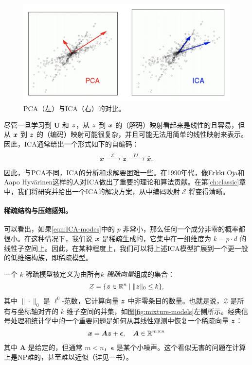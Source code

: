 \documentclass[../../book-main.tex]{subfiles}
\begin{document}
\begin{figure}
    \centering
    \includegraphics[width=0.7\linewidth]{figures/PCA_ICA.png}
    \caption{PCA（左）与ICA（右）的对比。}
    \label{fig:ICA-PCA}
\end{figure}

尽管一旦学习到 $\boldsymbol{U}$ 和 $\bm{z}$，从 $\bm{z}$ 到 $\bm{x}$ 的（解码）映射看起来是线性的且容易，但从 $\bm{x}$ 到 $\bm{z}$ 的（编码）映射可能很复杂，并且可能无法用简单的线性映射来表示。因此，ICA通常给出一个形式如下的自编码：
\begin{equation}
    \bm{x}   \xrightarrow{\hspace{2mm} \mathcal{E}\hspace{2mm}} \bm{z}  \xrightarrow{\hspace{2mm} \boldsymbol{U} \hspace{2mm}} \hat {\bm{x}}.
       \label{eqn:auto-encoding-ICA}
\end{equation}
因此，与PCA不同，ICA的分析和求解要困难一些。在1990年代，像Erkki Oja和Aapo Hyv\"{a}rinen\cite{hyvarinen-1997,Hyvrinen-2000}这样的人对ICA做出了重要的理论和算法贡献。在第\ref{ch:classic}章中，我们将研究并给出一个ICA的解决方案，从中编码映射 $\mathcal{E}$ 将变得清晰。



\paragraph{稀疏结构与压缩感知。}
可以看出，如果\eqref{eqn:ICA-modes}中的 $p$ 非常小，那么任何一个成分非零的概率都很小。在这种情况下，我们说 $\bm{x}$ 是稀疏生成的，它集中在一组维度为 $k = p \cdot d$ 的线性子空间上。因此，在某种程度上，我们可以将上述ICA模型扩展到一个更一般的低维结构族，即稀疏模型。

一个 $k$-稀疏模型被定义为由所有{\em $k$-稀疏向量}组成的集合：
\begin{equation}
    \mathcal{Z} = \{\bm{z} \in \mathbb{R}^n \mid \|\bm{z}\|_0 \le k\},
\end{equation}
其中 $\| \cdot \|_0$ 是 $\ell^0$-范数，它计算向量 $\bm{z}$ 中非零条目的数量。也就是说，$\mathcal{Z}$ 是所有与坐标轴对齐的 $k$ 维子空间的并集，如图\ref{fig:mixture-models}左侧所示。经典信号处理和统计学中的一个重要问题是如何从其线性观测中恢复一个稀疏向量 $\bm{z}$：
\begin{equation}
    \bm{x} = \boldsymbol{A} \bm{z} + \boldsymbol{\epsilon}, \quad \boldsymbol{A} \in \mathbb{R}^{m\times n}
    \label{eqn:sparse-model}
\end{equation}
其中 $\boldsymbol{A}$ 是给定的，但通常 $m < n$，$\boldsymbol{\epsilon}$ 是某个小噪声。这个看似无害的问题在计算上是NP难的，甚至难以近似（详见\cite{Wright-Ma-2022}一书）。
\end{document}

